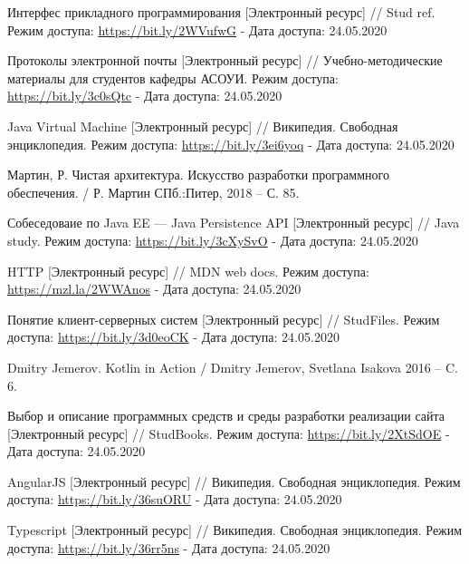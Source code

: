 \begingroup
\begin{thebibliography}{11}

    Интерфес прикладного программирования
    [Электронный ресурс] //
    Stud ref. 
    Режим доступа: \url{https://bit.ly/2WVufwG} -
    Дата доступа: 24.05.2020
    
    Протоколы электронной почты
    [Электронный ресурс] //
    Учебно-методические материалы для студентов кафедры АСОУИ. 
    Режим доступа: \url{https://bit.ly/3c0sQtc} -
    Дата доступа: 24.05.2020
    
    Java Virtual Machine
    [Электронный ресурс] //
    Википедия. Свободная энциклопедия. 
    Режим доступа: \url{https://bit.ly/3ei6yoq} -
    Дата доступа: 24.05.2020

    Мартин, Р.
    Чистая архитектура. Искусство разработки программного обеспечения. /
    Р. Мартин 
    СПб.:Питер, 2018 -- С. 85.

    Собеседоваие по Java EE --- Java Persistence API
    [Электронный ресурс] //
    Java study. 
    Режим доступа: \url{https://bit.ly/3cXySvO} -
    Дата доступа: 24.05.2020

    HTTP
    [Электронный ресурс] //
    MDN web docs. 
    Режим доступа: \url{https://mzl.la/2WWAnos} -
    Дата доступа: 24.05.2020

    Понятие клиент-серверных систем
    [Электронный ресурс] //
    StudFiles. 
    Режим доступа: \url{https://bit.ly/3d0eoCK} -
    Дата доступа: 24.05.2020

    Dmitry Jemerov.
    Kotlin in Action /
    Dmitry Jemerov, Svetlana Isakova
    2016 -- C. 6.

    Выбор и описание программных средств и среды разработки реализации сайта
    [Электронный ресурс] //
    StudBooks. 
    Режим доступа: \url{https://bit.ly/2XtSdOE} -
    Дата доступа: 24.05.2020

    AngularJS
    [Электронный ресурс] //
    Википедия. Свободная энциклопедия. 
    Режим доступа: \url{https://bit.ly/36suORU} -
    Дата доступа: 24.05.2020

    Typescript
    [Электронный ресурс] //
    Википедия. Свободная энциклопедия.
    Режим доступа: \url{https://bit.ly/36rr5ns} -
    Дата доступа: 24.05.2020

\end{thebibliography}
\endgroup

\clearpage